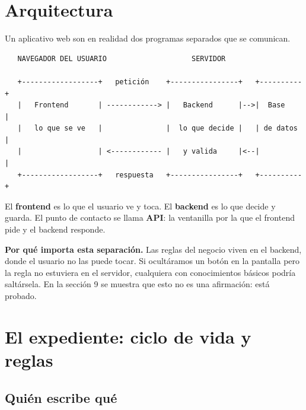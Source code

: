 \section{Arquitectura}

Un aplicativo web son en realidad dos programas separados que se comunican.

\begin{verbatim}
   NAVEGADOR DEL USUARIO                    SERVIDOR

   +------------------+   petición    +----------------+   +----------+
   |   Frontend       | ------------> |   Backend      |-->|  Base    |
   |   lo que se ve   |               |  lo que decide |   | de datos |
   |                  | <------------ |   y valida     |<--|          |
   +------------------+   respuesta   +----------------+   +----------+
\end{verbatim}

El \textbf{frontend} es lo que el usuario ve y toca. El \textbf{backend} es lo que
decide y guarda. El punto de contacto se llama \textbf{API}: la ventanilla por la
que el frontend pide y el backend responde.

\begin{clave}
\textbf{Por qué importa esta separación.} Las reglas del negocio viven en el
backend, donde el usuario no las puede tocar. Si ocultáramos un botón en la
pantalla pero la regla no estuviera en el servidor, cualquiera con conocimientos
básicos podría saltársela. En la sección 9 se muestra que esto no es una
afirmación: está probado.
\end{clave}

\section{El expediente: ciclo de vida y reglas}

\subsection{Quién escribe qué}

